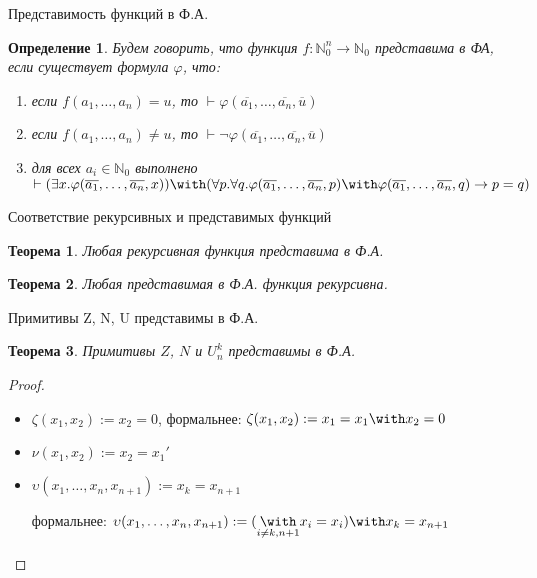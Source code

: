 \documentclass[aspectratio=169]{beamer}
\newtheorem{thm}{Теорема}[section]
\newtheorem{dfn}{Определение}[section]
\begin{document}
\begin{frame}{Представимость функций в Ф.А.}
\begin{dfn}
Будем говорить, что функция $f: \mathbb{N}^n_0\to\mathbb{N}_0$ представима в ФА, 
если существует формула $\varphi$, что:
\begin{enumerate}
\item если $f(a_1,\dots,a_n) = u$, то $\vdash \varphi(\overline{a_1},\dots,\overline{a_n},\overline{u})$
\item если $f(a_1,\dots,a_n) \ne u$, то $\vdash \neg\varphi(\overline{a_1},\dots,\overline{a_n},\overline{u})$
\item для всех $a_i \in \mathbb{N}_0$ выполнено $\vdash (\exists x.\varphi(\overline{a_1},\dots,\overline{a_n},x)) \with 
   (\forall p.\forall q.\varphi(\overline{a_1},\dots,\overline{a_n},p)\with \varphi(\overline{a_1},\dots,\overline{a_n},q)\rightarrow p=q)$
\end{enumerate}
\end{dfn}
\end{frame}

\begin{frame}{Соответствие рекурсивных и представимых функций}
\begin{thm}Любая рекурсивная функция представима в Ф.А.\end{thm}\pause

\begin{thm}Любая представимая в Ф.А. функция рекурсивна.\end{thm}
\end{frame}

\begin{frame}{Примитивы Z, N, U представимы в Ф.А.}
\begin{thm}
Примитивы $Z$, $N$ и $U^k_n$ представимы в Ф.А.
\end{thm}\pause

\begin{proof}
\begin{itemize}
\item $\zeta(x_1,x_2) := x_2=0$, \pause формальнее: $\zeta(x_1,x_2) := x_1=x_1 \with x_2=0$\pause
\item $\nu(x_1,x_2) := x_2=x_1'$\pause
\item $\upsilon(x_1,\dots,x_n,x_{n+1}) := x_k = x_{n+1}$ \pause \vspace{0.1cm}

формальнее: 
     $\upsilon(x_1,\dots,x_n,x_{n+1}) := (\underset{i\ne k,n+1}{\with} x_i=x_i) \with x_k = x_{n+1}$
\end{itemize}
\end{proof}
\end{frame}
\end{document}
